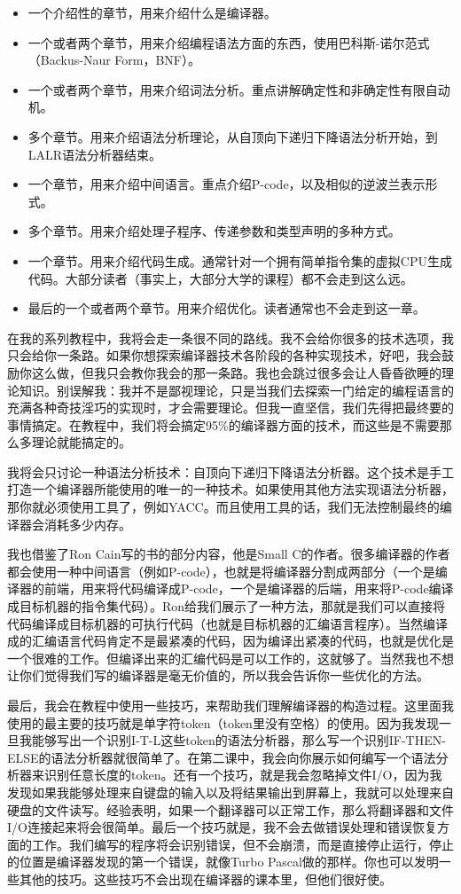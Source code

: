 \begin{itemize}
   \item 一个介绍性的章节，用来介绍什么是编译器。
   \item 一个或者两个章节，用来介绍编程语法方面的东西，使用巴科斯-诺尔范式（Backus-Naur Form，BNF）。
   \item 一个或者两个章节，用来介绍词法分析。重点讲解确定性和非确定性有限自动机。
   \item 多个章节。用来介绍语法分析理论，从自顶向下递归下降语法分析开始，到LALR语法分析器结束。
   \item 一个章节，用来介绍中间语言。重点介绍P-code，以及相似的逆波兰表示形式。
   \item 多个章节。用来介绍处理子程序、传递参数和类型声明的多种方式。
   \item 一个章节。用来介绍代码生成。通常针对一个拥有简单指令集的虚拟CPU生成代码。大部分读者（事实上，大部分大学的课程）都不会走到这么远。
   \item 最后的一个或者两个章节。用来介绍优化。读者通常也不会走到这一章。
\end{itemize}

在我的系列教程中，我将会走一条很不同的路线。我不会给你很多的技术选项，我只会给你一条路。如果你想探索编译器技术各阶段的各种实现技术，好吧，我会鼓励你这么做，但我只会教你我会的那一条路。我也会跳过很多会让人昏昏欲睡的理论知识。别误解我：我并不是鄙视理论，只是当我们去探索一门给定的编程语言的充满各种奇技淫巧的实现时，才会需要理论。但我一直坚信，我们先得把最终要的事情搞定。在教程中，我们将会搞定95\%的编译器方面的技术，而这些是不需要那么多理论就能搞定的。

我将会只讨论一种语法分析技术：自顶向下递归下降语法分析器。这个技术是手工打造一个编译器所能使用的唯一的一种技术。如果使用其他方法实现语法分析器，那你就必须使用工具了，例如YACC。而且使用工具的话，我们无法控制最终的编译器会消耗多少内存。

我也借鉴了Ron Cain写的书的部分内容，他是Small C的作者。很多编译器的作者都会使用一种中间语言（例如P-code），也就是将编译器分割成两部分（一个是编译器的前端，用来将代码编译成P-code，一个是编译器的后端，用来将P-code编译成目标机器的指令集代码）。Ron给我们展示了一种方法，那就是我们可以直接将代码编译成目标机器的可执行代码（也就是目标机器的汇编语言程序）。当然编译成的汇编语言代码肯定不是最紧凑的代码，因为编译出紧凑的代码，也就是优化是一个很难的工作。但编译出来的汇编代码是可以工作的，这就够了。当然我也不想让你们觉得我们写的编译器是毫无价值的，所以我会告诉你一些优化的方法。

最后，我会在教程中使用一些技巧，来帮助我们理解编译器的构造过程。这里面我使用的最主要的技巧就是单字符token（token里没有空格）的使用。因为我发现一旦我能够写出一个识别I-T-L这些token的语法分析器，那么写一个识别IF-THEN-ELSE的语法分析器就很简单了。在第二课中，我会向你展示如何编写一个语法分析器来识别任意长度的token。还有一个技巧，就是我会忽略掉文件I/O，因为我发现如果我能够处理来自键盘的输入以及将结果输出到屏幕上，我就可以处理来自硬盘的文件读写。经验表明，如果一个翻译器可以正常工作，那么将翻译器和文件I/O连接起来将会很简单。最后一个技巧就是，我不会去做错误处理和错误恢复方面的工作。我们编写的程序将会识别错误，但不会崩溃，而是直接停止运行，停止的位置是编译器发现的第一个错误，就像Turbo Pascal做的那样。你也可以发明一些其他的技巧。这些技巧不会出现在编译器的课本里，但他们很好使。

